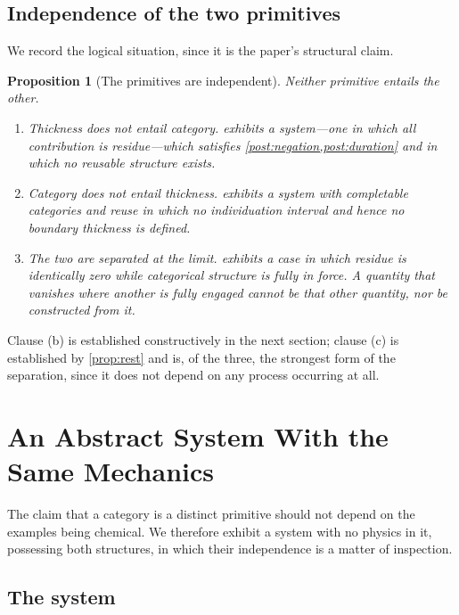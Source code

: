 \documentclass[11pt,twocolumn,a4paper]{article}
\theoremstyle{plain}
\newtheorem{proposition}[theorem]{Proposition}
\theoremstyle{definition}
\theoremstyle{remark}
\begin{document}
\subsection{Independence of the two primitives}
\label{sec:independence-statement}

We record the logical situation, since it is the paper's structural claim.

\begin{proposition}[The primitives are independent]
\label{prop:independent}
Neither primitive entails the other.
\begin{enumerate}[label=(\alph*),leftmargin=2.5em]
\item Thickness does not entail category.  exhibits a
system---one in which all contribution is residue---which satisfies
\cref{post:negation,post:duration} and in which no reusable structure exists.
\item Category does not entail thickness.  exhibits a
system with completable categories and reuse in which no individuation interval
and hence no boundary thickness is defined.
\item The two are separated at the limit.  exhibits a case in
which residue is identically zero while categorical structure is fully in
force. A quantity that vanishes where another is fully engaged cannot be that
other quantity, nor be constructed from it.
\end{enumerate}
\end{proposition}

Clause (b) is established constructively in the next section; clause (c) is
established by \cref{prop:rest} and is, of the three, the strongest form of the
separation, since it does not depend on any process occurring at all.

\section{An Abstract System With the Same Mechanics}
\label{sec:abstract-system}

The claim that a category is a distinct primitive should not depend on the
examples being chemical. We therefore exhibit a system with no physics in it,
possessing both structures, in which their independence is a matter of
inspection.

\subsection{The system}
\end{document}
